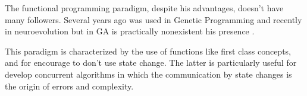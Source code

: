 
The functional programming paradigm, despite his advantages, doesn’t have many followers. Several years ago was used in Genetic Programming \cite{Briggs:2008:FGP:1375341.1375345,Huelsbergen:1996:TSE:1595536.1595579,walsh:1999:AFSFESIHLP} and recently in neuroevolution \cite{Sher2013} but in GA is practically nonexistent his presence \cite{Hawkins:2001:GFG:872017.872197}.

This paradigm is characterized by the use of functions like first class concepts, and for encourage to don’t use state change. The latter is particularly useful for develop concurrent algorithms in which the communication by state changes is the origin of errors and complexity.